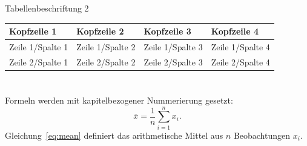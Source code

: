 \begin{hfhtable}
  \caption{Tabellenbeschriftung 2}
  \label{tab:sample}
  \begin{tabularx}{\textwidth}{@{}YYYY@{}}
    \toprule
    \textbf{Kopfzeile 1} &
    \textbf{Kopfzeile 2} &
    \textbf{Kopfzeile 3} &
    \textbf{Kopfzeile 4} \\
    \midrule
    Zeile 1/Spalte 1 & Zeile 1/Spalte 2 &
    Zeile 1/Spalte 3 & Zeile 1/Spalte 4 \\
    Zeile 2/Spalte 1 & Zeile 2/Spalte 2 &
    Zeile 2/Spalte 3 & Zeile 2/Spalte 4 \\
    \bottomrule
  \end{tabularx}
\end{hfhtable}

\section{}

Formeln werden mit kapitelbezogener Nummerierung gesetzt:
\begin{equation}
  \bar{x} = \frac{1}{n}\sum_{i=1}^{n} x_i.
  \label{eq:mean}
\end{equation}
Gleichung~\eqref{eq:mean} definiert das arithmetische Mittel aus
\(n\) Beobachtungen \(x_i\).
